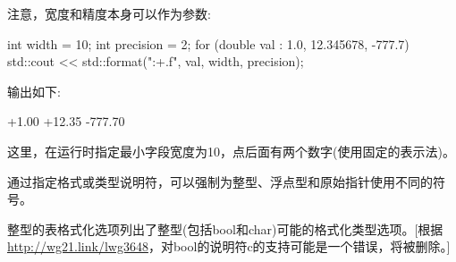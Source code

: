 注意，宽度和精度本身可以作为参数:

\begin{cpp}
int width = 10;
int precision = 2;
for (double val : {1.0, 12.345678, -777.7}) {
	std::cout << std::format("{:+{}.{}f}\n", val, width, precision);
}
\end{cpp}

输出如下:

\begin{shell}
    +1.00
   +12.35
  -777.70
\end{shell}

这里，在运行时指定最小字段宽度为10，点后面有两个数字(使用固定的表示法)。


通过指定格式或类型说明符，可以强制为整型、浮点型和原始指针使用不同的符号。


整型的表格式化选项列出了整型(包括bool和char)可能的格式化类型选项。[根据\url{http://wg21.link/lwg3648}，对bool的说明符c的支持可能是一个错误，将被删除。]

